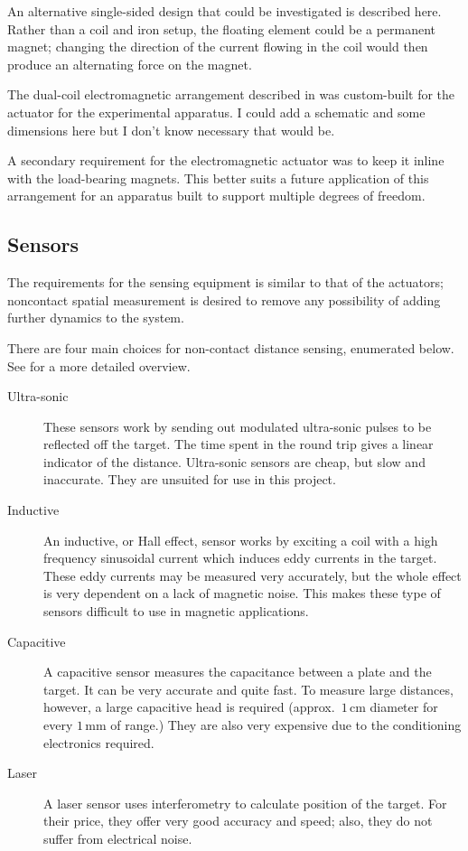 An alternative single-sided design that could be investigated is described
here. Rather than a coil and iron setup, the floating element could be a
permanent magnet; changing the direction of the current flowing in the coil
would then produce an alternating force on the magnet. 

The dual-coil electromagnetic arrangement described in  was
custom-built for the actuator for the experimental apparatus. I could add
a schematic and some dimensions here but I don't know necessary that would be.

A secondary requirement for the electromagnetic actuator was to keep it inline
with the load-bearing magnets. This better suits a future application of this
arrangement for an apparatus built to support multiple degrees of freedom.

\subsection{Sensors}

The requirements for the sensing equipment is similar to that
of the actuators; noncontact spatial measurement is desired
to remove any possibility of adding further dynamics to the system.

There are four main choices for non-contact distance sensing,
enumerated below. See \textcite{boehm1993} for a more detailed overview.
\begin{description}
\item[Ultra-sonic] 
    These sensors work by sending out modulated
    ultra-sonic pulses to be reflected off the target. The time spent
    in the round trip gives a linear indicator of the
    distance. Ultra-sonic sensors are cheap, but slow and
    inaccurate. They are unsuited for use in this project.
\item[Inductive] 
    An inductive, or Hall effect, sensor works by
    exciting a coil with a high frequency sinusoidal current which
    induces eddy currents in the target.  These eddy currents may be
    measured very accurately, but the whole effect is very dependent
    on a lack of magnetic noise. This makes these type of sensors
    difficult to use in magnetic applications.
\item[Capacitive] 
    A capacitive sensor measures the capacitance
    between a plate and the target.  It can be very accurate and quite
    fast. To measure large distances, however, a large capacitive head
    is required (approx.\ $1$\,cm diameter for every $1$\,mm of
    range.) They are also very expensive due to the conditioning
    electronics required.
\item[Laser] 
    A laser sensor uses interferometry to calculate position
    of the target. For their price, they offer very good accuracy and
    speed; also, they do not suffer from electrical noise.
\end{description}

